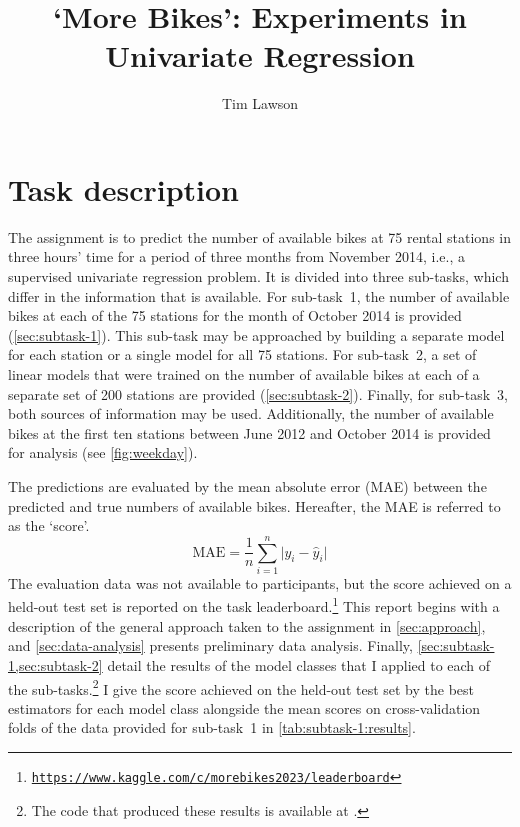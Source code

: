 \documentclass[11pt]{extarticle}
\newcommand{\kaggle}{https://www.kaggle.com/c/morebikes2023/leaderboard}
\begin{document}
\title{`More Bikes': Experiments in Univariate Regression}
\author[]{Tim Lawson}
\date{}

\maketitle

\section{Task description}
\label{sec:task-description}

The assignment is to predict the number of available bikes at 75 rental stations in
three hours' time for a period of three months from November 2014, i.e., a supervised
univariate regression problem.
It is divided into three sub-tasks, which differ in the information that is available.
For sub-task~1, the number of available bikes at each of the 75 stations for the month
of October 2014 is provided (\cref{sec:subtask-1}).
This sub-task may be approached by building a separate model for each station or a
single model for all 75 stations.
For sub-task~2, a set of linear models that were trained on the number of available
bikes at each of a separate set of 200 stations are provided (\cref{sec:subtask-2}).
Finally, for sub-task~3, both sources of information may be used.
Additionally, the number of available bikes at the first ten stations between June 2012
and October 2014 is provided for analysis (see \cref{fig:weekday}).

The predictions are evaluated by the mean absolute error (MAE) between the predicted
and true numbers of available bikes.
Hereafter, the MAE is referred to as the `score'.
\begin{equation}
  \label{eq:mae}
  \text{MAE} = \frac{1}{n} \sum_{i = 1}^n \lvert y_i - \hat{y}_i \rvert
\end{equation}
The evaluation data was not available to participants, but the score achieved on a
held-out test set is reported on the task
leaderboard.\footnote{\href{\kaggle}{\texttt{\kaggle}}} This report begins with a
description of the general approach taken to the assignment in \cref{sec:approach}, and
\cref{sec:data-analysis} presents preliminary data analysis.
Finally, \cref{sec:subtask-1,sec:subtask-2} detail the results of the model classes
that I applied to each of the sub-tasks.\footnote{The code that produced these results
  is available at .
}
I give the score achieved on the held-out test set by the best estimators for each
model class alongside the mean scores on cross-validation folds of the data provided
for sub-task~1 in \cref{tab:subtask-1:results}.
\end{document}

